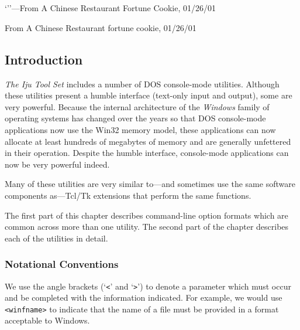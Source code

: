 \chapter{\cdcmzerolongtitle{}}

\label{cdcm0}


`''---From A Chinese Restaurant 
         Fortune Cookie, 01/26/01

                   {From A Chinese Restaurant fortune cookie, 01/26/01}

\section{Introduction}
\label{cdcm0:sint0}

\emph{The Iju Tool Set} includes a number of DOS console-mode utilities.
Although these utilities present a humble interface (text-only input and output),
some are very powerful.  Because the internal architecture of the
\emph{Windows} family of
operating systems has changed over the years so that DOS console-mode
applications now use the Win32 memory model, these applications can now
allocate at least hundreds of megabytes of memory and are generally unfettered
in their operation.  Despite the humble interface, console-mode applications
can now be very powerful indeed.

Many of these utilities are very similar to---and sometimes use the
same software components as---Tcl/Tk extensions that perform the same
functions.

The first part of this chapter describes command-line option formats which
are common across more than one utility.  The second part of the chapter describes
each of the utilities in detail.



\subsection{Notational Conventions}
\label{ctin0:sccl0:snco0}

We use the angle brackets (`\texttt{<}' and `\texttt{>}') to denote a 
parameter which must occur and be completed with the information
indicated.  For example, we would use \texttt{<winfname>} to indicate
that the name of a file must be provided in a format acceptable to 
Windows.

